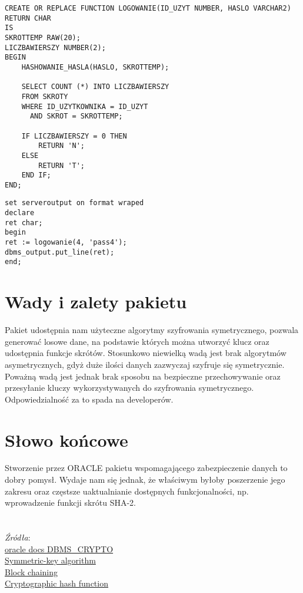 \documentclass[12pt, a4paper]{article}
\begin{document}
\begin{lstlisting}
CREATE OR REPLACE FUNCTION LOGOWANIE(ID_UZYT NUMBER, HASLO VARCHAR2) RETURN CHAR
IS
SKROTTEMP RAW(20);
LICZBAWIERSZY NUMBER(2);
BEGIN
	HASHOWANIE_HASLA(HASLO, SKROTTEMP);

	SELECT COUNT (*) INTO LICZBAWIERSZY
	FROM SKROTY
	WHERE ID_UZYTKOWNIKA = ID_UZYT
      AND SKROT = SKROTTEMP;
      
	IF LICZBAWIERSZY = 0 THEN 
		RETURN 'N';
	ELSE
		RETURN 'T';
	END IF;
END;
\end{lstlisting}
 
\begin{lstlisting}
set serveroutput on format wraped
declare
ret char;
begin
ret := logowanie(4, 'pass4');
dbms_output.put_line(ret);
end;
\end{lstlisting} 


\section{Wady i zalety pakietu}
Pakiet udostępnia nam użyteczne algorytmy szyfrowania symetrycznego, pozwala generować losowe dane, na podstawie których można utworzyć klucz oraz udostępnia funkcje skrótów.
Stosunkowo niewielką wadą jest brak algorytmów asymetrycznych, gdyż duże ilości danych zazwyczaj szyfruje się symetrycznie. Poważną wadą jest jednak brak sposobu na bezpieczne przechowywanie oraz przesyłanie kluczy
wykorzystywanych do szyfrowania symetrycznego. Odpowiedzialność za to spada na developerów.

\section{Słowo końcowe}
Stworzenie przez ORACLE pakietu wspomagającego zabezpieczenie danych to dobry pomysł. Wydaje nam się jednak, że właściwym byłoby poszerzenie jego zakresu 
oraz częstsze uaktualnianie dostępnych funkcjonalności, np. wprowadzenie funkcji skrótu SHA-2.
\\\\\\
\emph{Źródła}:\\
\href{http://docs.oracle.com/cd/E11882_01/appdev.112/e25788/d_crypto.htm}{oracle
docs DBMS\_CRYPTO}\\
\href{http://en.wikipedia.org/wiki/Symmetric-key_algorithm}{Symmetric-key
algorithm}\\
\href{http://en.wikipedia.org/wiki/Block_cipher_modes_of_operation}{Block
chaining}\\ 
\href{http://en.wikipedia.org/wiki/Cryptographic_hash_function}{Cryptographic
hash function}
\end{document}
